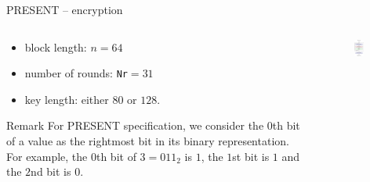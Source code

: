 \begin{frame}{PRESENT -- encryption}
\begin{columns}[T]
\begin{column}{.55\textwidth}
\begin{itemize}
    \item block length: $n=64$
       \item number of rounds: \texttt{Nr}$=31$
       \item key length: either $80$ or $128$.
\end{itemize}
\begin{alertblock}{Remark}
    For PRESENT specification, we consider the $0$th bit of a value as the rightmost bit in its binary representation.
For example, the $0$th bit of $3=011_2$ is $1$, the $1$st bit is $1$ and the $2$nd bit is $0$.
\end{alertblock}
\end{column}%
\hfill%
\begin{column}{.5\textwidth}
\begin{figure}
    \includegraphics[width=0.6\textwidth]{fig/PRESENT.pdf}
\end{figure}
\end{column}%
\end{columns}
\end{frame}

